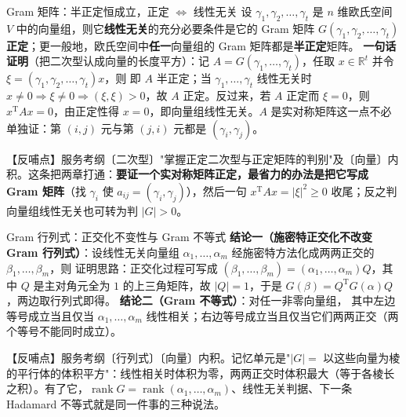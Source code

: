 \begin{fdeep}{Gram 矩阵：半正定恒成立，正定 $\iff$ 线性无关}
设 $\gamma_{1},\gamma_{2},\dots,\gamma_{t}$ 是 $n$ 维欧氏空间 $V$ 中的向量组，则它\textbf{线性无关}的充分必要条件是它的 Gram 矩阵 $G(\gamma_{1},\gamma_{2},\dots,\gamma_{t})$ \textbf{正定}；更一般地，欧氏空间中\textbf{任一}向量组的 Gram 矩阵都是\textbf{半正定}矩阵。
\textbf{一句话证明}（把二次型认成向量的长度平方）：记 $A=G(\gamma_{1},\dots,\gamma_{t})$，任取 $x\in\mathbb R^{t}$ 并令 $\xi=(\gamma_{1},\gamma_{2},\dots,\gamma_{t})x$，则
即 $A$ 半正定；当 $\gamma_{1},\dots,\gamma_{t}$ 线性无关时 $x\ne0\Rightarrow\xi\ne0\Rightarrow(\xi,\xi)>0$，故 $A$ 正定。反过来，若 $A$ 正定而 $\xi=0$，则 $x^{\mathrm T}Ax=0$，由正定性得 $x=0$，即向量组线性无关。$A$ 是实对称矩阵这一点不必单独证：第 $(i,j)$ 元与第 $(j,i)$ 元都是 $(\gamma_{i},\gamma_{j})$。

【反哺点】服务考纲〔二次型〕"掌握正定二次型与正定矩阵的判别"及〔向量〕内积。这条把两章打通：\textbf{要证一个实对称矩阵正定，最省力的办法是把它写成 Gram 矩阵}（找 $\gamma_{i}$ 使 $a_{ij}=(\gamma_{i},\gamma_{j})$），然后一句 $x^{\mathrm T}Ax=|\xi|^{2}\ge0$ 收尾；反之判向量组线性无关也可转为判 $|G|>0$。
\end{fdeep}


\begin{fdeep}{Gram 行列式：正交化不变性与 Gram 不等式}
\textbf{结论一（施密特正交化不改变 Gram 行列式）}：设线性无关向量组 $\alpha_{1},\dots,\alpha_{m}$ 经施密特方法化成两两正交的 $\beta_{1},\dots,\beta_{m}$，则
证明思路：正交化过程可写成 $(\beta_{1},\dots,\beta_{m})=(\alpha_{1},\dots,\alpha_{m})Q$，其中 $Q$ 是主对角元全为 $1$ 的上三角矩阵，故 $|Q|=1$，于是 $G(\beta)=Q^{\mathrm T}G(\alpha)Q$，两边取行列式即得。
\textbf{结论二（Gram 不等式）}：对任一非零向量组，
其中左边等号成立当且仅当 $\alpha_{1},\dots,\alpha_{m}$ 线性相关；右边等号成立当且仅当它们两两正交（两个等号不能同时成立）。

【反哺点】服务考纲〔行列式〕〔向量〕内积。记忆单元是"$|G|=$ 以这些向量为棱的平行体的体积平方"：线性相关时体积为零，两两正交时体积最大（等于各棱长之积）。有了它，$\operatorname{rank}G=\operatorname{rank}(\alpha_{1},\dots,\alpha_{m})$、线性无关判据、下一条 Hadamard 不等式就是同一件事的三种说法。
\end{fdeep}


